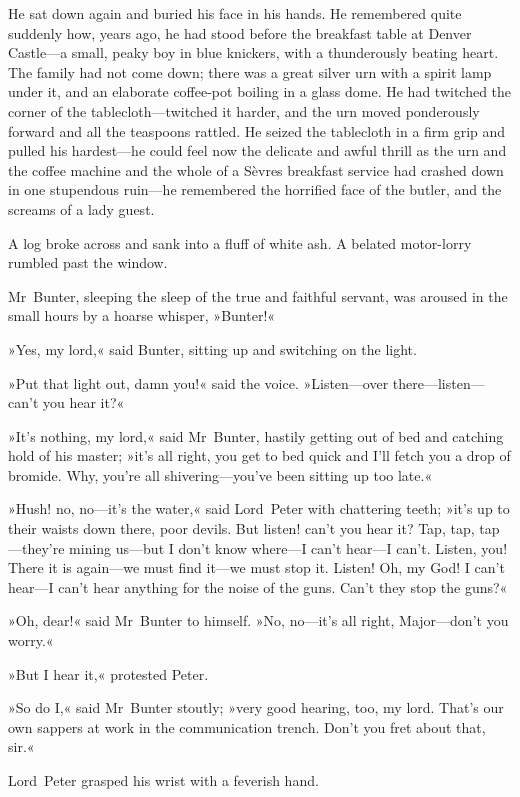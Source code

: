 He sat down again and buried his face in his hands. He remembered quite suddenly how, years ago, he had stood before the breakfast table at Denver Castle—a small, peaky boy in blue knickers, with a thunderously beating heart. The family had not come down; there was a great silver urn with a spirit lamp under it, and an elaborate coffee-pot boiling in a glass dome. He had twitched the corner of the tablecloth—twitched it harder, and the urn moved ponderously forward and all the teaspoons rattled. He seized the tablecloth in a firm grip and pulled his hardest—he could feel now the delicate and awful thrill as the urn and the coffee machine and the whole of a Sèvres breakfast service had crashed down in one stupendous ruin—he remembered the horrified face of the butler, and the screams of a lady guest.

A log broke across and sank into a fluff of white ash. A belated motor-lorry rumbled past the window.

Mr~Bunter, sleeping the sleep of the true and faithful servant, was aroused in the small hours by a hoarse whisper, »Bunter!«

»Yes, my lord,« said Bunter, sitting up and switching on the light.

»Put that light out, damn you!« said the voice. »Listen—over there—listen—can't you hear it?«

»It's nothing, my lord,« said Mr~Bunter, hastily getting out of bed and catching hold of his master; »it's all right, you get to bed quick and I'll fetch you a drop of bromide. Why, you're all shivering—you've been sitting up too late.«

»Hush! no, no—it's the water,« said Lord~Peter with chattering teeth; »it's up to their waists down there, poor devils. But listen! can't you hear it? Tap, tap, tap—they're mining us—but I don't know where—I can't hear—I can't. Listen, you! There it is again—we must find it—we must stop it\textellipsis . Listen! Oh, my God! I can't hear—I can't hear anything for the noise of the guns. Can't they stop the guns?«

»Oh, dear!« said Mr~Bunter to himself. »No, no—it's all right, Major—don't you worry.«

»But I hear it,« protested Peter.

»So do I,« said Mr~Bunter stoutly; »very good hearing, too, my lord. That's our own sappers at work in the communication trench. Don't you fret about that, sir.«

Lord~Peter grasped his wrist with a feverish hand.

